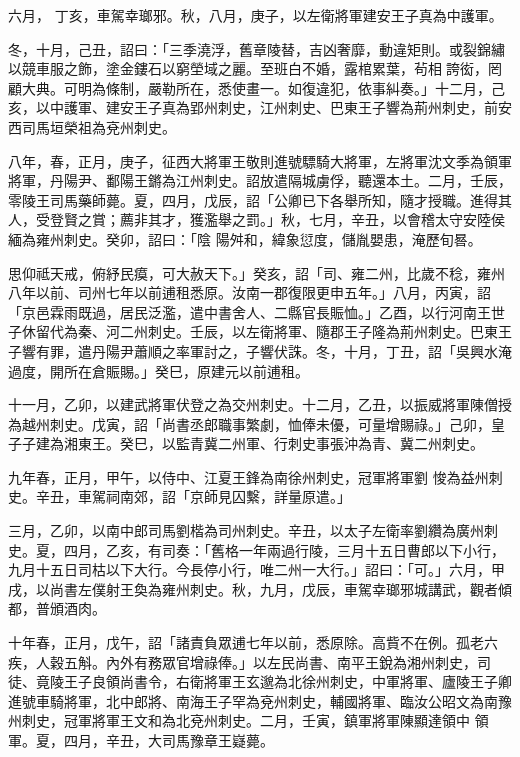 \begin{pinyinscope}
 六月，
 丁亥，車駕幸瑯邪。秋，八月，庚子，以左衛將軍建安王子真為中護軍。



 冬，十月，己丑，詔曰：「三季澆浮，舊章陵替，吉凶奢靡，動違矩則。或裂錦繡以競車服之飾，塗金鏤石以窮塋域之麗。至班白不婚，露棺累葉，茍相誇衒，罔顧大典。可明為條制，嚴勒所在，悉使畫一。如復違犯，依事糾奏。」十二月，己亥，以中護軍、建安王子真為郢州刺史，江州刺史、巴東王子響為荊州刺史，前安西司馬垣榮祖為兗州刺史。



 八年，春，正月，庚子，征西大將軍王敬則進號驃騎大將軍，左將軍沈文季為領軍將軍，丹陽尹、鄱陽王鏘為江州刺史。詔放遣隔城虜俘，聽還本土。二月，壬辰，零陵王司馬藥師薨。夏，四月，戊辰，詔「公卿已下各舉所知，隨才授職。進得其人，受登賢之賞；薦非其才，獲濫舉之罰。」秋，七月，辛丑，以會稽太守安陸侯緬為雍州刺史。癸卯，詔曰：「陰
 陽舛和，緯象愆度，儲胤嬰患，淹歷旬晷。



 思仰祗天戒，俯紓民瘼，可大赦天下。」癸亥，詔「司、雍二州，比歲不稔，雍州八年以前、司州七年以前逋租悉原。汝南一郡復限更申五年。」八月，丙寅，詔「京邑霖雨既過，居民泛濫，遣中書舍人、二縣官長賑恤。」乙酉，以行河南王世子休留代為秦、河二州刺史。壬辰，以左衛將軍、隨郡王子隆為荊州刺史。巴東王子響有罪，遣丹陽尹蕭順之率軍討之，子響伏誅。冬，十月，丁丑，詔「吳興水淹過度，開所在倉賑賜。」癸巳，原建元以前逋租。



 十一月，乙卯，以建武將軍伏登之為交州刺史。十二月，乙丑，以振威將軍陳僧授為越州刺史。戊寅，詔「尚書丞郎職事繁劇，恤俸未優，可量增賜祿。」己卯，皇子子建為湘東王。癸巳，以監青冀二州軍、行刺史事張沖為青、冀二州刺史。



 九年春，正月，甲午，以侍中、江夏王鋒為南徐州刺史，冠軍將軍劉
 悛為益州刺史。辛丑，車駕祠南郊，詔「京師見囚繫，詳量原遣。」



 三月，乙卯，以南中郎司馬劉楷為司州刺史。辛丑，以太子左衛率劉纘為廣州刺史。夏，四月，乙亥，有司奏：「舊格一年兩過行陵，三月十五日曹郎以下小行，九月十五日司枯以下大行。今長停小行，唯二州一大行。」詔曰：「可。」六月，甲戌，以尚書左僕射王奐為雍州刺史。秋，九月，戊辰，車駕幸瑯邪城講武，觀者傾都，普頒酒肉。



 十年春，正月，戊午，詔「諸責負眾逋七年以前，悉原除。高貲不在例。孤老六疾，人穀五斛。內外有務眾官增祿俸。」以左民尚書、南平王銳為湘州刺史，司徒、竟陵王子良領尚書令，右衛將軍王玄邈為北徐州刺史，中軍將軍、廬陵王子卿進號車騎將軍，北中郎將、南海王子罕為兗州刺史，輔國將軍、臨汝公昭文為南豫州刺史，冠軍將軍王文和為北兗州刺史。二月，壬寅，鎮軍將軍陳顯達領中
 領軍。夏，四月，辛丑，大司馬豫章王嶷薨。




\end{pinyinscope}
